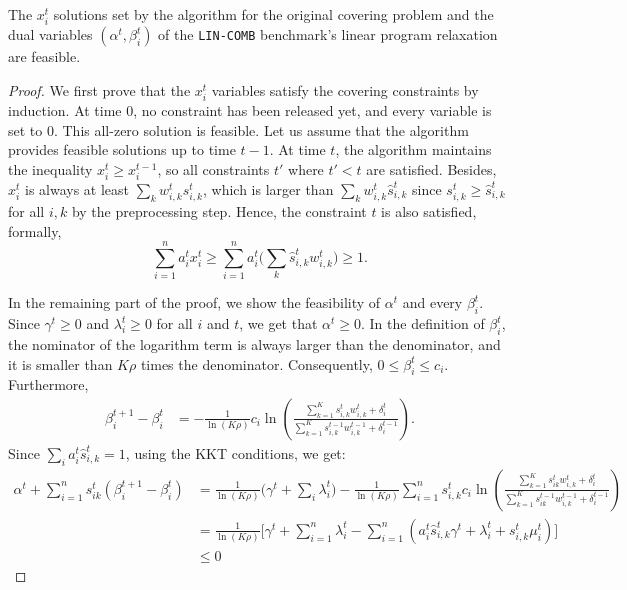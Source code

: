 \begin{lemma} \label{lem:covering-feasibility}
The $x_{i}^{t}$ solutions set by the algorithm for the original covering problem and the dual variables $(\alpha^{t}, \beta_{i}^{t})$ of the \texttt{LIN-COMB} benchmark's linear program relaxation are feasible.
\end{lemma}
%
\begin{proof}
We first prove that the $x_{i}^{t}$ variables satisfy the covering constraints by induction. At time 0, no constraint has been released yet, and every variable is set to 0. This all-zero solution is feasible. Let us assume that the algorithm provides feasible solutions up to time $t-1$. At time $t$, the algorithm maintains the inequality $x_{i}^{t} \geq x_{i}^{t-1}$, so all constraints $t'$ where $t' < t$ are satisfied. Besides, $x_{i}^{t}$ is always at least
$\sum_{k} w_{i,k}^{t} s_{i,k}^{t}$, which is larger than $\sum_{k} w_{i,k}^{t} \hat{s}_{i,k}^{t}$ since $s_{i,k}^{t} \geq \hat{s}_{i,k}^{t}$
for all $i,k$ by the preprocessing step. Hence, the constraint $t$ is also satisfied, formally,
$$
\sum_{i=1}^{n} a_{i}^{t} x_{i}^{t}  \geq \sum_{i=1}^{n} a_{i}^{t} \biggl( \sum_{k} \hat{s}_{i,k}^{t} w_{i,k}^{t} \biggr) \geq 1.
$$

In the remaining part of the proof, we show the feasibility of $\alpha^{t}$ and every $\beta_{i}^{t}$.
Since $ \gamma^{t} \geq 0$ and $\lambda_{i}^{t} \geq 0$ for all $i$ and $t$, we get that $\alpha^{t} \geq 0$.
In the definition of  $\beta_{i}^{t}$, the nominator of the logarithm term is always larger than the denominator, and it is smaller than $K\rho$ times the denominator. Consequently, $0 \leq \beta_{i}^{t} \leq c_{i}$. Furthermore,
%
\begin{align*}
    \beta_{i}^{t+1} - \beta_{i}^{t}
    	&= - \frac{1}{\ln(K\rho)} c_i \ln \left( \frac{\sum_{k=1}^{K}  s_{i,k}^{t} w_{i,k}^{t} + \delta_{i}^{t}}{\sum_{k=1}^{K}  s_{i,k}^{t-1}w_{i,k}^{t-1} + \delta_{i}^{t-1}} \right).
\end{align*}
%
Since $\sum_{i} a_{i}^{t} \hat{s}_{i,k}^{t} = 1$, using the KKT conditions, we get:
\begin{align*}
\alpha^{t} + \sum_{i=1}^{n} s_{ik}^{t} \left(\beta_{i}^{t+1} - \beta_{i}^{t}\right)
&= \frac{1}{\ln(K\rho)} \biggl( \gamma^{t} + \sum_{i} \lambda_{i}^{t} \biggr)
	- \frac{1}{\ln(K\rho)}  \sum_{i=1}^{n} s_{i,k}^{t} c_i \ln \left( \frac{\sum_{k=1}^{K}  s_{ik}^{t} w_{i,k}^{t} + \delta_{i}^{t}}{\sum_{k=1}^{K}  s_{ik}^{t-1}w_{i,k}^{t-1} + \delta_{i}^{t-1}} \right) \\
%
&= \frac{1}{\ln(K\rho)} \biggl[ \gamma^{t} + \sum_{i=1}^{n} \lambda_{i}^{t} - \sum_{i=1}^{n} \left( a_{i}^{t} \hat{s}_{i,k}^{t} \gamma^{t} + \lambda_{i}^{t} + s_{i,k}^{t} \mu_{i}^{t} \right) \biggr] \\
%
&\leq 0
\end{align*}
\end{proof}


